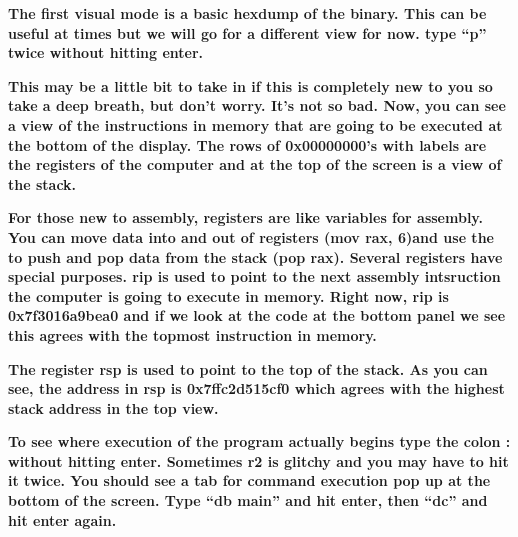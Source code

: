 \documentclass[letterpaper]{article}
\newcommand{\sitfig}[3]{
\begin{figure}[H]
\centering
\makebox[\textwidth][c]{
#2
}
\label{#1}
\end{figure}
}
\newcommand{\sitgfx}[4][scale=1.0]{
\sitfig{#3}{\texttt{[image: \#2]}}{#4}
}
\begin{document}
\textbf{The first visual mode is a basic hexdump of the binary. This can be useful at times but we will go for a
different view for now. type ``p'' twice without hitting enter.}

  
\sitgfx[width=5.8335in,height=3.6457in]{reversing-img077.png}{fig:unk}{TODO CAPTION}
 

\textbf{This may be a little bit to take in if this is completely new to you so take a deep breath, but don't worry.
It's not so bad. Now, you can see a view of the instructions in memory that are going to be executed at the bottom of
the display. The rows of 0x00000000's with labels are the registers of the computer and at the top of the screen is a
view of the stack.}

  
\sitgfx[width=5.8335in,height=3.6457in]{reversing-img027.png}{fig:unk}{TODO CAPTION}
 

\textbf{For those new to assembly, registers are like variables for assembly. You can move data into and out of
registers (mov rax, 6)and use the to push and pop data from the stack (pop rax). Several registers have special
purposes. rip is used to point to the next assembly intsruction the computer is going to execute in memory. Right now,
rip is 0x7f3016a9bea0 and if we look at the code at the bottom panel we see this agrees with the topmost instruction in
memory.}

  
\sitgfx[width=5.8335in,height=3.6457in]{reversing-img078.png}{fig:unk}{TODO CAPTION}
 

\textbf{The register rsp is used to point to the top of the stack. As you can see, the address in rsp is 0x7ffc2d515cf0
which agrees with the highest stack address in the top view.}

  
\sitgfx[width=5.8335in,height=3.6457in]{reversing-img079.png}{fig:unk}{TODO CAPTION}
 

\textbf{To see where execution of the program actually begins type the colon : without hitting enter. Sometimes r2 is
glitchy and you may have to hit it twice. You should see a tab for command execution pop up at the bottom of the
screen. Type ``db main'' and hit enter, then ``dc'' and hit enter again.}

  
\sitgfx[width=5.8335in,height=3.6457in]{reversing-img080.png}{fig:unk}{TODO CAPTION}
 
\end{document}
